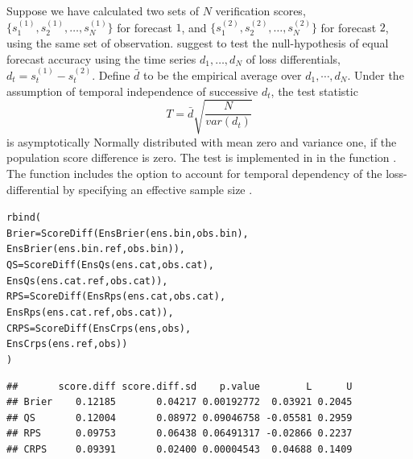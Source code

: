 \documentclass[article]{jss}\usepackage[]{graphicx}\usepackage[]{color}
\makeatletter
\newcommand{\hlstd}[1]{\textcolor[rgb]{0,0,0}{#1}}%
\newcommand{\hlkwc}[1]{\textcolor[rgb]{0,0.502,0.753}{#1}}%
\newcommand{\hlkwd}[1]{\textcolor[rgb]{0,0.267,0.4}{#1}}%
\newenvironment{kframe}{%
 \def\at@end@of@kframe{}%
 \ifinner\ifhmode%
  \def\at@end@of@kframe{\end{minipage}}%
  \begin{minipage}{\columnwidth}%
 \fi\fi%
 \def\FrameCommand##1{\hskip\@totalleftmargin \hskip-\fboxsep
 \colorbox{shadecolor}{##1}\hskip-\fboxsep
     \hskip-\linewidth \hskip-\@totalleftmargin \hskip\columnwidth}%
 \MakeFramed {\advance\hsize-\width
   \@totalleftmargin\z@ \linewidth\hsize
   \@setminipage}}%
 {\par\unskip\endMakeFramed%
 \at@end@of@kframe}
\newenvironment{knitrout}{}{} %
\makeatother
\begin{document}
Suppose we have calculated two sets of $N$ verification scores, $\{s^{(1)}_1, s^{(1)}_2, \dots, s^{(1)}_N\}$ for forecast $1$, and $\{s^{(2)}_1, s^{(2)}_2, \dots, s^{(2)}_N\}$ for forecast $2$, using the same set of observation.
\citet{diebold1995comparing} suggest to test the null-hypothesis of equal forecast accuracy using the time series $d_1, \dots, d_N$ of loss differentials, $d_t = s^{(1)}_t - s^{(2)}_t$. 
Define $\bar{d}$ to be the empirical average over $d_1,\cdots, d_N$.
Under the assumption of temporal independence of successive $d_t$, the test statistic 
%
\begin{equation}
T = \bar{d}\sqrt{\frac{N}{var(d_t)}}
\end{equation}
%
is asymptotically Normally distributed with mean zero and variance one, if the population score difference is zero.
The test is implemented in  in the function .
The function includes the option to account for temporal dependency of the loss-differential by specifying an effective sample size .
%
\begin{knitrout}
\color{fgcolor}\begin{kframe}
\begin{alltt}
\hlkwd{rbind}\hlstd{(}
  \hlkwc{Brier} \hlstd{=} \hlkwd{ScoreDiff}\hlstd{(}\hlkwd{EnsBrier}\hlstd{(ens.bin,     obs.bin),}
                    \hlkwd{EnsBrier}\hlstd{(ens.bin.ref, obs.bin)),}
  \hlkwc{QS}    \hlstd{=} \hlkwd{ScoreDiff}\hlstd{(}\hlkwd{EnsQs}\hlstd{(   ens.cat,     obs.cat),}
                    \hlkwd{EnsQs}\hlstd{(   ens.cat.ref, obs.cat)),}
  \hlkwc{RPS}   \hlstd{=} \hlkwd{ScoreDiff}\hlstd{(}\hlkwd{EnsRps}\hlstd{(  ens.cat,     obs.cat),}
                    \hlkwd{EnsRps}\hlstd{(  ens.cat.ref, obs.cat)),}
  \hlkwc{CRPS}  \hlstd{=} \hlkwd{ScoreDiff}\hlstd{(}\hlkwd{EnsCrps}\hlstd{( ens,         obs),}
                    \hlkwd{EnsCrps}\hlstd{( ens.ref,     obs))}
\hlstd{)}
\end{alltt}
\begin{verbatim}
##       score.diff score.diff.sd    p.value        L      U
## Brier    0.12185       0.04217 0.00192772  0.03921 0.2045
## QS       0.12004       0.08972 0.09046758 -0.05581 0.2959
## RPS      0.09753       0.06438 0.06491317 -0.02866 0.2237
## CRPS     0.09391       0.02400 0.00004543  0.04688 0.1409
\end{verbatim}
\end{kframe}
\end{knitrout}
\end{document}
